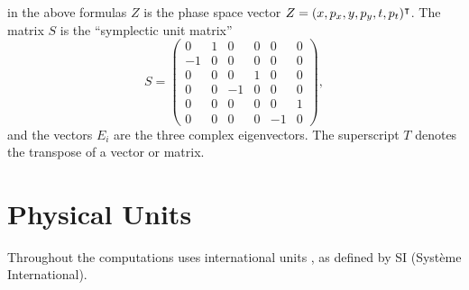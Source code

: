 in the above formulas $Z$ is the phase space vector
$Z = (x, p_x, y, p_y, t, p_t)^\intercal$.
The matrix $S$ is the ``symplectic unit matrix''
\[
S =
\begin{pmatrix}
    0 & 1 & 0 & 0 & 0 & 0 \\
   -1 & 0 & 0 & 0 & 0 & 0 \\
    0 & 0 & 0 & 1 & 0 & 0 \\
    0 & 0 &-1 & 0 & 0 & 0 \\
    0 & 0 & 0 & 0 & 0 & 1 \\
    0 & 0 & 0 & 0 &-1 & 0
  \end{pmatrix},
\]
and the vectors $E_i$ are the three complex eigenvectors.
The superscript $T$ denotes the transpose of a vector or matrix.

\section{Physical Units}
\label{sec:units}
Throughout the computations \opal uses international units ,
as defined by SI (Syst\`eme International).


